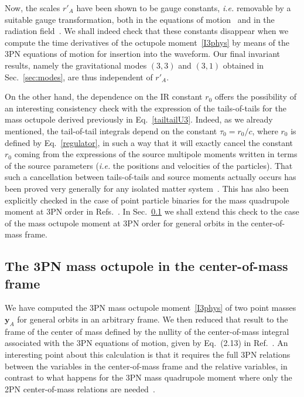 \documentclass[prd,preprint,superscriptaddress,tightenlines,nofootinbib,
  eqsecnum,showpacs]{revtex4}
\begin{document}
Now, the scales $r'_A$ have been shown to be gauge constants,
\textit{i.e.}  removable by a suitable gauge transformation, both in
the equations of motion~\cite{BFeom} and in the radiation
field~\cite{BIJ02, BI04mult}. We shall indeed check that these
constants disappear when we compute the time derivatives of the
octupole moment~\eqref{I3phys} by means of the 3PN equations of motion
for insertion into the waveform. Our final invariant results, namely
the gravitational modes $(3,3)$ and $(3,1)$ obtained in
Sec.~\ref{sec:modes}, are thus independent of $r'_A$.

On the other hand, the dependence on the IR constant $r_0$ offers the
possibility of an interesting consistency check with the expression of
the tails-of-tails for the mass octupole derived previously in
Eq.~\eqref{tailtailU3}. Indeed, as we already mentioned, the
tail-of-tail integrals depend on the constant $\tau_0=r_0/c$, where
$r_0$ is defined by Eq.~\eqref{regulator}, in such a way that it will
exactly cancel the constant $r_0$ coming from the expressions of the
source multipole moments written in terms of the source parameters
(\textit{i.e.} the positions and velocities of the particles). That
such a cancellation between tails-of-tails and source moments actually
occurs has been proved very generally for any isolated matter
system~\cite{B98tail, B98mult}. This has also been explicitly checked
in the case of point particle binaries for the mass quadrupole moment
at 3PN order in Refs.~\cite{BIJ02, BI04mult}. In Sec.~\ref{sec:octCM}
we shall extend this check to the case of the mass octupole moment at
3PN order for general orbits in the center-of-mass frame.

\subsection{The 3PN mass octupole in the center-of-mass frame}
\label{sec:octCM}
 
We have computed the 3PN mass octupole moment~\eqref{I3phys} of two
point masses $\bm{y}_A$ for general orbits in an arbitrary frame. We
then reduced that result to the frame of the center of mass defined by
the nullity of the center-of-mass integral associated with the 3PN
equations of motion, given by Eq.~(2.13) in Ref.~\cite{BI03CM}. An
interesting point about this calculation is that it requires the full
3PN relations between the variables in the center-of-mass frame and
the relative variables, in contrast to what happens for the 3PN mass
quadrupole moment where only the 2PN center-of-mass relations are
needed~\cite{BI04mult}.
\end{document}
